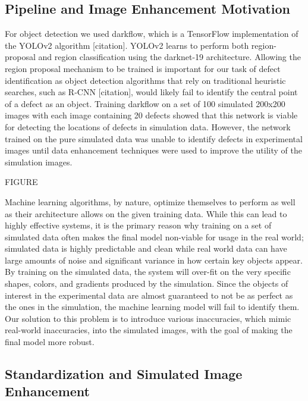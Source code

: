 \documentclass[prl,reprint,showpacs,floatfix,nofootinbib]{revtex4-1}
\begin{document}
\subsection{Pipeline and Image Enhancement Motivation}

For object detection we used darkflow, which is a TensorFlow implementation of the YOLOv2 algorithm [citation]. YOLOv2 learns to perform both region-proposal and region classification using the darknet-19 architecture. Allowing the region proposal mechanism to be trained is important for our task of defect identification as object detection algorithms that rely on traditional heuristic searches, such as R-CNN [citation], would likely fail to identify the central point of a defect as an object. Training darkflow on a set of 100 simulated 200x200 images with each image containing 20 defects showed that this network is viable for detecting the locations of defects in simulation data. However, the network trained on the pure simulated data was unable to identify defects in experimental images until data enhancement techniques were used to improve the utility of the simulation images.

FIGURE

Machine learning algorithms, by nature, optimize themselves to perform as well as their architecture allows on the given training data. While this can lead to highly effective systems, it is the primary reason why training on a set of simulated data often makes the final model non-viable for usage in the real world; simulated data is highly predictable and clean while real world data can have large amounts of noise and significant variance in how certain key objects appear. By training on the simulated data, the system will over-fit on the very specific shapes, colors, and gradients produced by the simulation. Since the objects of interest in the experimental data are almost guaranteed to not be as perfect as the ones in the simulation, the machine learning model will fail to identify them. Our solution to this problem is to introduce various inaccuracies, which mimic real-world inaccuracies, into the simulated images, with the goal of making the final model more robust.

\subsection{Standardization and Simulated Image Enhancement}
\end{document}
